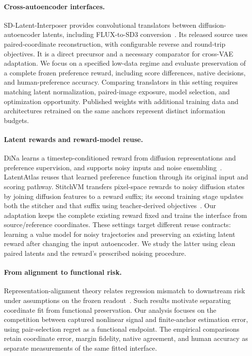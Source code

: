 \documentclass[10pt,twocolumn,letterpaper]{article}
\begin{document}
\paragraph{Cross-autoencoder interfaces.}
SD-Latent-Interposer provides convolutional translators between diffusion-autoencoder latents, including FLUX-to-SD3 conversion~\cite{city96latentinterposer}. Its released source uses paired-coordinate reconstruction, with configurable reverse and round-trip objectives. It is a direct precursor and a necessary comparator for cross-VAE adaptation. We focus on a specified low-data regime and evaluate preservation of a complete frozen preference reward, including score differences, native decisions, and human-preference accuracy. Comparing translators in this setting requires matching latent normalization, paired-image exposure, model selection, and optimization opportunity. Published weights with additional training data and architectures retrained on the same anchors represent distinct information budgets.

\paragraph{Latent rewards and reward-model reuse.}
DiNa learns a timestep-conditioned reward from diffusion representations and preference supervision, and supports noisy inputs and noise ensembling~\cite{liu2026beyond}. LatentAtlas reuses that learned preference function through its original input and scoring pathway. StitchVM transfers pixel-space rewards to noisy diffusion states by joining diffusion features to a reward suffix; its second training stage updates both the stitcher and that suffix using teacher-derived objectives~\cite{go2026stitchvm}. Our adaptation keeps the complete existing reward fixed and trains the interface from source/reference coordinates. These settings target different reuse contracts: learning a value model for noisy trajectories and preserving an existing latent reward after changing the input autoencoder. We study the latter using clean paired latents and the reward's prescribed noising procedure.

\paragraph{From alignment to functional risk.}
Representation-alignment theory relates regression mismatch to downstream risk under assumptions on the frozen readout~\cite{insulla2025alignment}. Such results motivate separating coordinate fit from functional preservation. Our analysis focuses on the competition between captured nonlinear signal and finite-anchor estimation error, using pair-selection regret as a functional endpoint. The empirical comparisons retain coordinate error, margin fidelity, native agreement, and human accuracy as separate measurements of the same fitted interface.
\end{document}
